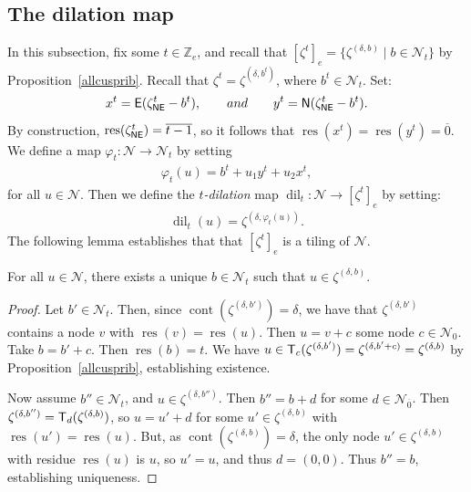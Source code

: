 \documentclass[Unicode,ALCO]{cedram}
\newcommand{\res}{\operatorname{res}}
\newcommand{\infl}{\operatorname{dil}}
\newcommand{\Z}{\mathbb{Z}}
\newcommand{\N}{\mathcal{N}}
\newcommand{\0}{{\bar 0}}
\def\phi{{\varphi}}
\newcommand{\no}{{\sf N}}
\newcommand{\ea}{{\sf E}}
\newcommand{\T}{{\sf T}}
\newcommand{\nnee}{{\sf NE}}
\def\cont{{\operatorname{cont}}}
\begin{document}
\subsection{The dilation map}\label{infldef}
In this subsection, fix some \(t \in \Z_e\), and recall that \(
[\zeta^t]_e =  \{\zeta^{(\delta, b)} \mid b \in \N_t\}
\) by Proposition~\ref{allcusprib}. Recall that \(\zeta^t = \zeta^{(\delta, b^t)}\), where \(b^t \in \N_t\). Set:
\begin{align*}
x^t= \ea(\zeta^{t}_{\nnee} - b^t),
\qquad
\textup{and}
\qquad
 y^t= \no(\zeta^{t}_{\nnee} - b^t).
\end{align*}
By construction, \(\res(\zeta^{t}_{\nnee}) = \overline{t-1}\), so it follows that \(\res(x^t) = \res(y^t) = \overline 0\). 
We define a map \(\phi_t: \N \to \N_t\) by setting
\begin{align*}
\phi_t(u) = b^t+ u_1y^t + u_2x^t,
\end{align*}
for all \(u \in \N\). 
Then we define the {\em \(t\)-dilation} map \(\infl_t: \N \to [\zeta^t]_e\) by setting:
\begin{align*}
\infl_t(u) = \zeta^{(\delta, \phi_t(u))}.
\end{align*}
The following lemma establishes that that \([\zeta^t]_e\) is a tiling of \(\N\).

\begin{lemma}\label{tilelem}
For all \(u \in \N\), there exists a unique \(b \in \N_t\) such that \(u \in \zeta^{(\delta,b)}\).
\end{lemma}
\begin{proof}
Let \(b' \in \N_t\). Then, since \(\cont(\zeta^{(\delta, b')}) = \delta\), we have that \(\zeta^{(\delta, b')}\) contains a node \(v\) with \(\res(v) = \res(u)\). Then  \(u = v+ c\) some node \(c \in \N_0\). 
Take \(b = b' + c\). Then \(\res(b) = t\). We have \(u \in \T_c(\zeta^{(\delta,b')}) = \zeta^{(\delta, b' + c)} = \zeta^{(\delta,b)}\) by Proposition~\ref{allcusprib}, establishing existence.

Now assume \(b'' \in \N_t\), and \(u \in \zeta^{(\delta, b'')}\). Then \(b'' = b + d\) for some \(d \in \N_{\overline 0}\). Then \(\zeta^{(\delta,b'')} = \T_d(\zeta^{(\delta, b)})\), so \(u= u'+ d\) for some \(u' \in \zeta^{(\delta, b)}\) with \(\res(u') = \res(u)\). But, as \(\cont(\zeta^{(\delta,b)}) = \delta\), the only node \(u' \in \zeta^{(\delta,b)}\) with residue \(\res(u)\) is \(u\), so \(u' = u\), and thus \(d=(0,0)\). Thus \(b'' = b\), establishing uniqueness.
\end{proof}
\end{document}
